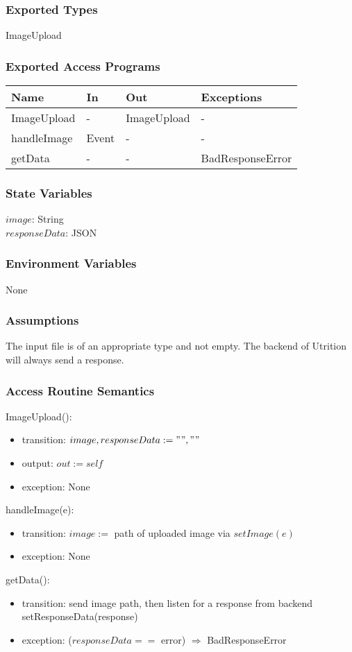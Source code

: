 \documentclass[12pt, titlepage]{article}
\begin{document}
\subsubsection{Exported Types}
ImageUpload
\subsubsection{Exported Access Programs}
\begin{center}
	\begin{tabular}{p{3cm} p{4cm} p{4cm} p{3cm}}
		\hline
		\textbf{Name} & \textbf{In} & \textbf{Out} & \textbf{Exceptions} \\
		\hline
		ImageUpload & - & ImageUpload &- \\
		handleImage & Event & - & - \\
		getData & - & - & BadResponseError \\
		\hline
	\end{tabular}
\end{center}
\subsubsection{State Variables}
$image$: String\\
$responseData$: JSON
\subsubsection{Environment Variables}
None
\subsubsection{Assumptions}
The input file is of an appropriate type and not empty. The backend of Utrition will always send a response.
\subsubsection{Access Routine Semantics}
ImageUpload():
\begin{itemize}
	\item transition: $image, responseData := "", ""$
	\item output: $out := self$
	\item exception: None
\end{itemize}
\noindent
handleImage(e):
\begin{itemize}
	\item transition: $image :=$ path of uploaded image via $setImage(e)$
	\item exception: None
\end{itemize}
\noindent
getData():
\begin{itemize}
	\item transition: send image path, then listen for a response from 
	backend\\ setResponseData(response)
	\item exception: ($responseData ==$ error) $\Rightarrow$ BadResponseError
\end{itemize}
\end{document}
